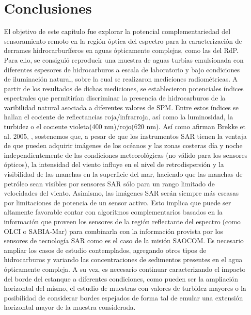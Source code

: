     \section{Conclusiones}
    \label{oil:s:conclusiones}
        El objetivo de este capítulo fue explorar la potencial complementariedad del sensoramiento remoto en la región óptica del espectro para la caracterización de derrames hidrocarburíferos en aguas ópticamente complejas, como las del RdP.
        Para ello, se consiguió reproducir una muestra de aguas turbias emulsionada con diferentes espesores de hidrocarburos a escala de laboratorio y bajo condiciones de iluminación natural, sobre la cual se realizaron mediciones radiométricas. A partir de los resultados de dichas mediciones, se establecieron potenciales índices espectrales que permitirían discriminar la presencia de hidrocarburos de la varibilidad natural asociada a diferentes valores de SPM. Entre estos índices se hallan el cociente de reflectancias roja/infrarroja, así como la luminosidad, la turbidez o el cociente violeta(400 nm)/rojo(620 nm).
        Así como afirman Brekke et al. 2005, \cite{brekke2005}, sostenemos que, a pesar de que los instrumentos SAR tienen la ventaja de que pueden adquirir imágenes de los océanos y las zonas costeras día y noche independientemente de las condiciones meteorológicas (no válido para los sensores ópticos), la intensidad del viento influye en el nivel de retrodispersión y la visibilidad de las manchas en la superficie del mar, haciendo que las manchas de petróleo sean visibles por sensores SAR sólo para un rango limitado de velocidades del viento. Asimismo, las imágenes SAR serán siempre más escasas por limitaciones de potencia de un sensor activo. Esto implica que puede ser altamente favorable contar con algoritmos complementarios basados en la información que proveen los sensores de la región reflectante del espectro (como OLCI o SABIA-Mar) para combinarla con la información provista por los sensores de tecnología SAR como es el caso de la misión SAOCOM.
        Es necesario ampliar los casos de estudio contemplados, agregando otros tipos de hidrocarburos y variando las concentraciones de sedimentos presentes en el agua ópticamente compleja. A su vez, es necesario continuar caracterizando el impacto del borde del estanque a diferentes condiciones, como pueden ser la ampliación horizontal del mismo, el estudio de muestras con valores de turbidez mayores o la posibilidad de considerar bordes espejados de forma tal de emular una extensión horizontal mayor de la muestra considerada.
